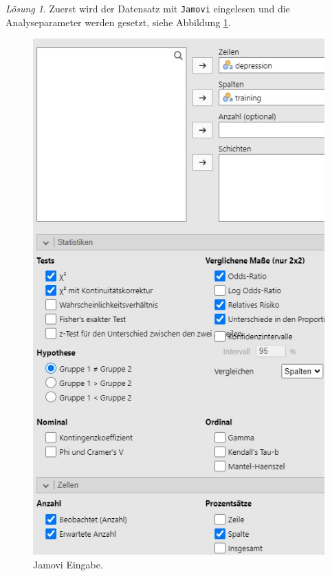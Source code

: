 \documentclass[
]{book}
\theoremstyle{definition}
\theoremstyle{definition}
\theoremstyle{definition}
\theoremstyle{definition}
\theoremstyle{remark}
\newtheorem*{solution}{Lösung}
\begin{document}
\begin{solution}

Zuerst wird der Datensatz mit \texttt{Jamovi} eingelesen und die
Analyseparameter werden gesetzt, siehe Abbildung
\ref{fig:sol-depression-training-input}.

\begin{figure}

{\centering \includegraphics{figures/09-exr-depression-training-jmv-input} 

}

\caption{Jamovi Eingabe.}\label{fig:sol-depression-training-input}
\end{figure}


\end{solution}
\end{document}
